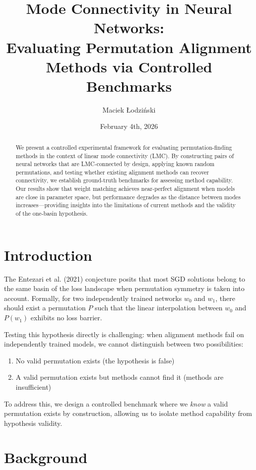 \documentclass[11pt,a4paper]{article}
\title{Mode Connectivity in Neural Networks: \\ Evaluating Permutation Alignment Methods via Controlled Benchmarks}
\author{Maciek Łodziński}
\date{February 4th, 2026}
\begin{document}
\maketitle

\begin{abstract}
We present a controlled experimental framework for evaluating permutation-finding methods in the context of linear mode connectivity (LMC). By constructing pairs of neural networks that are LMC-connected by design, applying known random permutations, and testing whether existing alignment methods can recover connectivity, we establish ground-truth benchmarks for assessing method capability. Our results show that weight matching achieves near-perfect alignment when models are close in parameter space, but performance degrades as the distance between modes increases—providing insights into the limitations of current methods and the validity of the one-basin hypothesis.
\end{abstract}

\section{Introduction}

The Entezari et al. (2021) conjecture posits that most SGD solutions belong to the same basin of the loss landscape when permutation symmetry is taken into account. Formally, for two independently trained networks $w_0$ and $w_1$, there should exist a permutation $P$ such that the linear interpolation between $w_0$ and $P(w_1)$ exhibits no loss barrier.

Testing this hypothesis directly is challenging: when alignment methods fail on independently trained models, we cannot distinguish between two possibilities:
\begin{enumerate}
    \item[(A)] No valid permutation exists (the hypothesis is false)
    \item[(B)] A valid permutation exists but methods cannot find it (methods are insufficient)
\end{enumerate}

To address this, we design a controlled benchmark where we \textit{know} a valid permutation exists by construction, allowing us to isolate method capability from hypothesis validity.

\section{Background}
\end{document}
